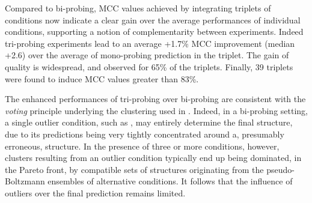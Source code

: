 \documentclass[a4,center,fleqn]{NAR}
\begin{document}
Compared to bi-probing, MCC values achieved by integrating triplets of conditions now indicate a clear gain over the average performances of individual conditions, supporting a notion of complementarity between experiments. Indeed tri-probing experiments lead to an average +1.7\% MCC improvement (median +2.6) over the average of mono-probing prediction in the triplet. The gain of quality is widespread, and observed for 65\% of the triplets. Finally, 39 triplets were found to induce MCC values greater than 83\%.

The enhanced performances of tri-probing over bi-probing are consistent with the \emph{voting} principle underlying the clustering used in \OurTool. Indeed, in a bi-probing setting, a single outlier condition, such as \NAICE, may entirely determine the final structure, due to its predictions being very tightly concentrated around a, presumably erroneous, structure. In the presence of three or more conditions, however, clusters resulting from an outlier condition typically end up being dominated, in the Pareto front, by compatible sets of structures originating from the pseudo-Boltzmann ensembles of alternative conditions. It follows that the influence of outliers over the final prediction remains limited.

\end{document}
